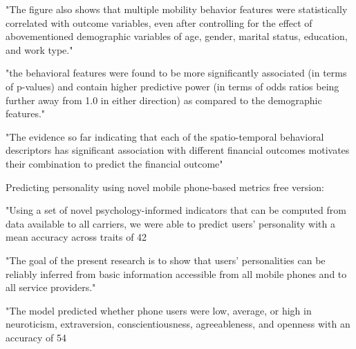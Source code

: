 "The figure also shows that multiple mobility behavior features were statistically correlated with outcome variables, even after controlling for the effect of abovementioned demographic variables of age, gender, marital status, education, and work type."

"the behavioral features were found to be more significantly associated (in terms of p-values) and contain higher predictive power (in terms of odds ratios being further away from 1.0 in either direction) as compared to the demographic features."

"The evidence so far indicating that each of the spatio-temporal behavioral descriptors has significant association with different financial outcomes motivates their combination to predict the financial outcome"




Predicting personality using novel mobile phone-based metrics
free version:

"Using a set of novel psychology-informed indicators that can be computed from data available to all carriers, we were able to predict users’ personality with a mean accuracy across traits of 42%

"The goal of the present research is to show that users’ personalities can be reliably inferred from basic information accessible from all mobile phones and to all service providers."


"The model predicted whether phone users were low, average, or high in neuroticism, extraversion, conscientiousness, agreeableness, and openness with an accuracy of 54%


